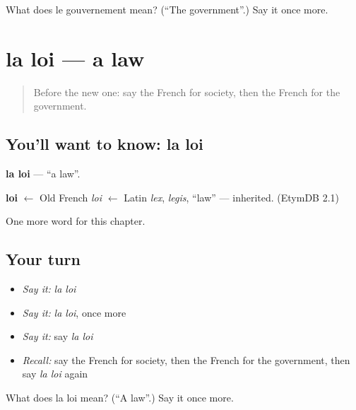 \begin{tcolorbox}[breakable,colback=teal!4,colframe=teal!35!black,title={Before you move on}]
What does le gouvernement mean? (\textquotedblleft{}The government\textquotedblright{}.) Say it once more.
\end{tcolorbox}
\section[la loi]{la loi — a law}

\label{lesson:FR-C222-loi}



\begin{quote}
Before the new one: say the French for society, then the French for the government.
\end{quote}

\subsection*{You'll want to know: la loi}
\textbf{la loi} — \textquotedblleft{}a law\textquotedblright{}.

\begin{cousinweb}
\textbf{loi} $\leftarrow$ Old French \emph{loi} $\leftarrow$ Latin \emph{lex}, \emph{legis}, \textquotedblleft{}law\textquotedblright{} — inherited. (EtymDB 2.1)
\end{cousinweb}

\begin{grammarlens}[title={What you've built}]
One more word for this chapter.
\end{grammarlens}

\subsection*{Your turn}
\begin{itemize}
\raggedright
  \item \emph{Say it:} \emph{la loi}
  \item \emph{Say it:} \emph{la loi}, once more
  \item \emph{Say it:} say \emph{la loi}
  \item \emph{Recall:} say the French for society, then the French for the government, then say \emph{la loi} again
\end{itemize}

\begin{tcolorbox}[breakable,colback=teal!4,colframe=teal!35!black,title={Before you move on}]
What does la loi mean? (\textquotedblleft{}A law\textquotedblright{}.) Say it once more.
\end{tcolorbox}
